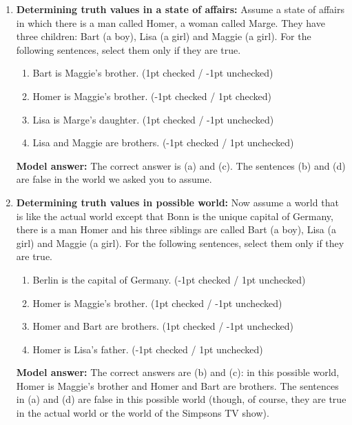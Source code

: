 \documentclass[a4,11pt]{article}
\begin{document}
\begin{enumerate}[leftmargin = 12pt]
 {\bf Model answer:} The correct answer is (a) and (c). The sentences (b) and (d) are false in the actual world.
 
  \item {\bf Determining truth values in a state of affairs:} Assume a state of affairs in which there is a man called Homer, a woman called Marge. They have three children: Bart (a boy), Lisa (a girl) and Maggie (a girl). For the following sentences, select them only if they are true. 

      \begin{enumerate}[noitemsep]
        \item Bart is Maggie's brother. (1pt checked / -1pt unchecked)
        \item Homer is Maggie's brother. (-1pt checked / 1pt checked)
        \item Lisa is Marge's daughter. (1pt checked / -1pt unchecked)
        \item Lisa and Maggie are brothers. (-1pt checked / 1pt unchecked)
         \end{enumerate}
         
 {\bf Model answer:} The correct answer is (a) and (c). The sentences (b) and (d) are false in the world we asked you to assume. 
 
  \item {\bf Determining truth values in possible world:} Now assume a world that is like the actual world except that Bonn is the unique capital of Germany, there is a man Homer and his three siblings are called Bart (a boy), Lisa (a girl) and Maggie (a girl). For the following sentences, select them only if they are true. 

      \begin{enumerate}[noitemsep]
        \item Berlin is the capital of Germany. (-1pt checked / 1pt unchecked)
        \item Homer is Maggie's brother. (1pt checked / -1pt unchecked)
        \item Homer and Bart are brothers. (1pt checked / -1pt unchecked)
        \item Homer is Lisa's father. (-1pt checked / 1pt unchecked)
         \end{enumerate}
         
 {\bf Model answer:} The correct answers are (b) and (c): in this possible world, Homer is Maggie's brother and Homer and Bart are brothers. The sentences in (a) and (d) are false in this possible world (though, of course, they are true in the actual world or the world of the Simpsons TV show).


\end{enumerate}
\end{document}
